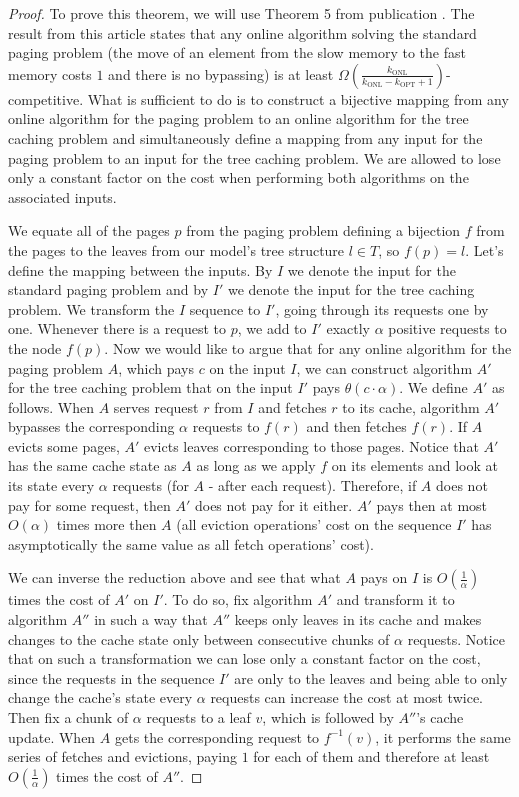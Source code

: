 \begin{proof}
To prove this theorem, we will use
Theorem 5 from publication \cite{tarjan}. The result from this article
states that any online algorithm solving the standard paging problem (the move of an element from
the slow memory to the fast memory costs $1$ and there is no bypassing) is at least
$\Omega(\frac{k_{\mathrm{ONL}}}{k_{\mathrm{ONL}}- k_{\mathrm{OPT}} +
1})$-competitive. What is sufficient to do is to construct a bijective mapping
from any online algorithm for the paging problem to an online algorithm for the tree
caching problem and simultaneously define a mapping from any input for the paging problem to an input
for the tree caching problem. We are allowed to lose only a constant factor on the cost
when performing both algorithms on the associated inputs.

We equate all of the pages $p$ from the paging problem defining a bijection $f$ from the
pages to the leaves from our model's tree structure $l \in T$, so $f(p) = l$. Let's define the mapping between the
inputs. By $I$ we denote the input for the standard paging problem and by $I'$ we denote the input for the tree
caching problem. We transform the $I$ sequence to $I'$, going through its requests one by one.
Whenever there is a request to $p$, we add to $I'$ exactly $\alpha$ positive requests to the node
$f(p)$. Now we would like to argue that for any online algorithm for the paging
problem $A$, which pays $c$ on the input $I$, we can construct algorithm $A'$ for the
tree caching problem that on the input $I'$ pays $\theta(c \cdot \alpha)$. We
define $A'$ as follows.  When $A$ serves request $r$ from $I$ and fetches $r$ to
its cache, algorithm $A'$ bypasses the corresponding $\alpha$ requests to $f(r)$ and then
fetches $f(r)$. If $A$ evicts some pages, $A'$ evicts leaves corresponding to those 
pages. Notice that $A'$ has the same cache state as $A$ as long as we apply
$f$ on its elements and look at its state every $\alpha$ requests (for $A$ - after each request).
Therefore, if $A$ does not pay for some request, then $A'$ does not
pay for it either. $A'$ pays then at most $O(\alpha)$ times more then $A$ (all
eviction operations' cost on the sequence $I'$ has asymptotically the same value
as all fetch operations' cost).

We can inverse the reduction above and see that what $A$ pays on $I$ is
$O(\frac{1}{\alpha})$ times the cost of $A'$ on $I'$. To do so, fix algorithm
$A'$ and transform it to algorithm $A''$ in such a way that $A''$ keeps only leaves in its cache and
makes changes to the cache state only between consecutive chunks of $\alpha$ requests.
Notice that on such a transformation we can lose only a constant factor on the cost, since the requests in the
sequence $I'$ are only to the leaves and being able to only change the cache's state every $\alpha$ requests
can increase the cost at most twice. Then fix a chunk of $\alpha$ requests to a leaf $v$,
which is followed by $A''$'s cache update. When $A$ gets the corresponding request to $f^{-1}(v)$, 
it performs the same series of fetches and evictions, paying $1$ for each of them and therefore at least $O(\frac{1}{\alpha})$ times the cost of $A''$.\end{proof}

